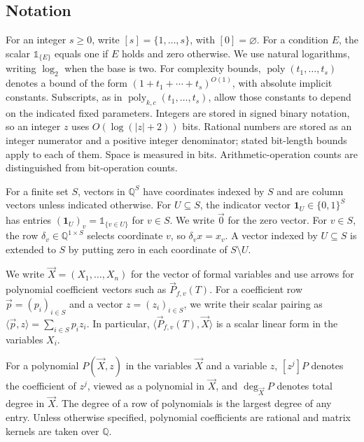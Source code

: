 \documentclass[11pt,reqno]{amsart}
\numberwithin{equation}{section}
\theoremstyle{definition}\newtheorem{definition}[theorem]{Definition}
\theoremstyle{remark}\newtheorem{remark}[theorem]{Remark}
\newcommand{\poly}{\operatorname{poly}}
\renewcommand{\ge}{\geqslant}
\begin{document}
\subsection{Notation}\label{subsec:notation}
For an integer $s\ge0$, write $[s]=\{1,\ldots,s\}$, with
$[0]=\varnothing$. For a condition $E$, the scalar
$\mathds{1}_{\{E\}}$ equals one if $E$ holds and zero otherwise.
We use natural logarithms, writing $\log_2$ when the base is two.
For complexity bounds, $\poly(t_1,\ldots,t_s)$ denotes a bound of the
form $(1+t_1+\cdots+t_s)^{O(1)}$, with absolute implicit constants.
Subscripts, as in $\poly_{k,c}(t_1,\ldots,t_s)$, allow those constants
to depend on the indicated fixed parameters. Integers are stored in
signed binary notation, so an integer $z$ uses $O(\log(|z|+2))$ bits.
Rational numbers are stored as an integer numerator and a positive
integer denominator; stated bit-length bounds apply to each of them.
Space is measured in bits. Arithmetic-operation counts are distinguished
from bit-operation counts.

For a finite set $S$, vectors in $\mathbb Q^S$ have coordinates
indexed by $S$ and are column vectors unless indicated otherwise.
For $U\subseteq S$, the indicator vector $\mathbf1_U\in\{0,1\}^S$
has entries $(\mathbf1_U)_v=\mathds{1}_{\{v\in U\}}$ for $v\in S$.
We write $\vec{0}$ for the zero vector. For $v\in S$, the row
$\delta_v\in\mathbb Q^{1\times S}$ selects coordinate $v$, so
$\delta_vx=x_v$. A vector indexed by $U\subseteq S$ is extended
to $S$ by putting zero in each coordinate of $S\setminus U$.

We write $\vec{X}=(X_1,\ldots,X_n)$ for the vector of formal variables
and use arrows for polynomial coefficient vectors such as
$\vec{P}_{f,v}(T)$. For a coefficient row $\vec{p}=(p_i)_{i\in S}$
and a vector $z=(z_i)_{i\in S}$, we write their scalar pairing as
$\langle\vec{p},z\rangle=\sum_{i\in S}p_i z_i$.
In particular, $\langle\vec{P}_{f,v}(T),\vec{X}\rangle$ is a
scalar linear form in the variables $X_i$.

For a polynomial $P(\vec{X},z)$ in the variables $\vec{X}$ and a variable $z$,
$[z^j]P$ denotes the coefficient of $z^j$, viewed as a polynomial
in $\vec{X}$, and $\deg_{\vec{X}} P$ denotes total degree in $\vec{X}$.
The degree of a row of polynomials is the largest
degree of any entry. Unless otherwise specified, polynomial
coefficients are rational and matrix kernels are taken over
$\mathbb Q$.










\end{document}
